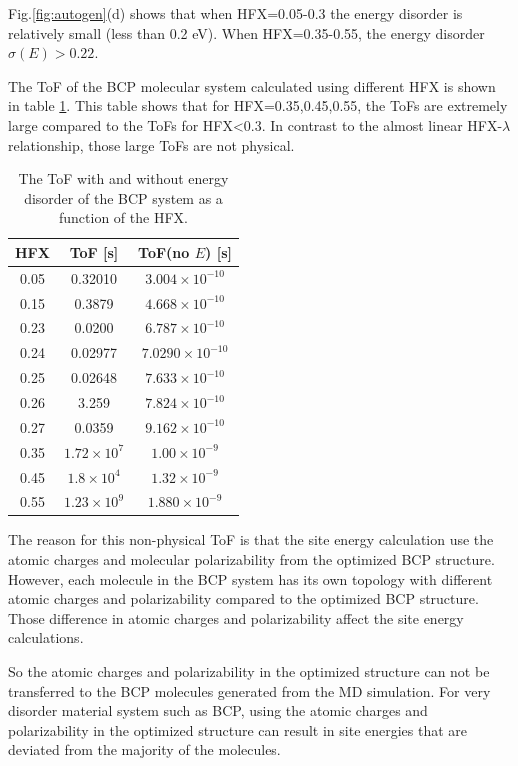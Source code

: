 \documentclass[letterpaper,12pt]{article}
\begin{document}
Fig.\ref{fig:autogen}(d) shows that when HFX=0.05-0.3 the energy disorder is relatively small (less than 0.2 eV). When HFX=0.35-0.55, the energy disorder $\sigma(E)>0.22$. 

The ToF of the BCP molecular system calculated using different HFX is shown in table \ref{tab:ToF_BCP_HFX}. This table shows that for HFX=0.35,0.45,0.55, the ToFs are extremely large compared to the ToFs for HFX<0.3. 
In contrast to the almost linear HFX-$\lambda$ relationship, those large ToFs are not physical. 


\begin{table}[h]
    \centering
    \begin{tabular}{c c c }
    \hline
        HFX & ToF [s] & ToF(no $E$) [s] \\
    \hline
        0.05 &  0.32010 & $3.004 \times 10^{-10}$ \\
        0.15 & 0.3879 & $4.668 \times 10^{-10}$ \\
        0.23 & 0.0200 & $6.787 \times 10^{-10} $ \\
        0.24 & 0.02977 & $7.0290 \times 10^{-10} $ \\
        0.25 & 0.02648 & $7.633 \times 10^{-10}$ \\
        0.26 & 3.259 & $7.824 \times 10^{-10}$ \\
        0.27 & 0.0359 &  $9.162 \times 10^{-10}$ \\
        0.35 & $1.72 \times 10^7 $ & $1.00 \times 10^{-9}$ \\
        0.45 & $1.8 \times 10^4$ & $1.32\times 10^{-9}$ \\
        0.55 & $1.23 \times 10^9 $ & $1.880 \times 10^{-9} $ \\
    \hline
    \end{tabular}
    \caption{The ToF with and without energy disorder of the BCP system as a function of the HFX. }
    \label{tab:ToF_BCP_HFX}
\end{table}


The reason for this non-physical ToF is that the site energy calculation use the atomic charges and molecular polarizability from the optimized BCP structure. However, each molecule in the BCP system has its own topology with different atomic charges and polarizability compared to the optimized BCP structure.  
Those difference in atomic charges and polarizability affect the site energy calculations. 

So the atomic charges and polarizability in the optimized structure can not be transferred to the BCP molecules generated from the MD simulation. 
For very disorder material system such as BCP, using the atomic charges and polarizability in the optimized structure can result in site energies that are deviated from the majority of the molecules. 
\end{document}
